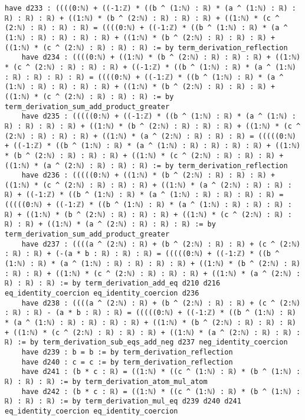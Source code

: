 \documentclass{article}
\begin{document}
\begin{tcolorbox}[colback=white!10, width=\linewidth]
\begin{lstlisting}[language=Lean4]
    have d233 : ((((0:ℕ) + ((-1:ℤ) * ((b ^ (1:ℕ) : ℝ) * (a ^ (1:ℕ) : ℝ) : ℝ) : ℝ) : ℝ) + ((1:ℕ) * (b ^ (2:ℕ) : ℝ) : ℝ) : ℝ) + ((1:ℕ) * (c ^ (2:ℕ) : ℝ) : ℝ) : ℝ) = ((((0:ℕ) + ((-1:ℤ) * ((b ^ (1:ℕ) : ℝ) * (a ^ (1:ℕ) : ℝ) : ℝ) : ℝ) : ℝ) + ((1:ℕ) * (b ^ (2:ℕ) : ℝ) : ℝ) : ℝ) + ((1:ℕ) * (c ^ (2:ℕ) : ℝ) : ℝ) : ℝ) := by term_derivation_reflection
    have d234 : ((((0:ℕ) + ((1:ℕ) * (b ^ (2:ℕ) : ℝ) : ℝ) : ℝ) + ((1:ℕ) * (c ^ (2:ℕ) : ℝ) : ℝ) : ℝ) + ((-1:ℤ) * ((b ^ (1:ℕ) : ℝ) * (a ^ (1:ℕ) : ℝ) : ℝ) : ℝ) : ℝ) = ((((0:ℕ) + ((-1:ℤ) * ((b ^ (1:ℕ) : ℝ) * (a ^ (1:ℕ) : ℝ) : ℝ) : ℝ) : ℝ) + ((1:ℕ) * (b ^ (2:ℕ) : ℝ) : ℝ) : ℝ) + ((1:ℕ) * (c ^ (2:ℕ) : ℝ) : ℝ) : ℝ) := by term_derivation_sum_add_product_greater
    have d235 : (((((0:ℕ) + ((-1:ℤ) * ((b ^ (1:ℕ) : ℝ) * (a ^ (1:ℕ) : ℝ) : ℝ) : ℝ) : ℝ) + ((1:ℕ) * (b ^ (2:ℕ) : ℝ) : ℝ) : ℝ) + ((1:ℕ) * (c ^ (2:ℕ) : ℝ) : ℝ) : ℝ) + ((1:ℕ) * (a ^ (2:ℕ) : ℝ) : ℝ) : ℝ) = (((((0:ℕ) + ((-1:ℤ) * ((b ^ (1:ℕ) : ℝ) * (a ^ (1:ℕ) : ℝ) : ℝ) : ℝ) : ℝ) + ((1:ℕ) * (b ^ (2:ℕ) : ℝ) : ℝ) : ℝ) + ((1:ℕ) * (c ^ (2:ℕ) : ℝ) : ℝ) : ℝ) + ((1:ℕ) * (a ^ (2:ℕ) : ℝ) : ℝ) : ℝ) := by term_derivation_reflection
    have d236 : (((((0:ℕ) + ((1:ℕ) * (b ^ (2:ℕ) : ℝ) : ℝ) : ℝ) + ((1:ℕ) * (c ^ (2:ℕ) : ℝ) : ℝ) : ℝ) + ((1:ℕ) * (a ^ (2:ℕ) : ℝ) : ℝ) : ℝ) + ((-1:ℤ) * ((b ^ (1:ℕ) : ℝ) * (a ^ (1:ℕ) : ℝ) : ℝ) : ℝ) : ℝ) = (((((0:ℕ) + ((-1:ℤ) * ((b ^ (1:ℕ) : ℝ) * (a ^ (1:ℕ) : ℝ) : ℝ) : ℝ) : ℝ) + ((1:ℕ) * (b ^ (2:ℕ) : ℝ) : ℝ) : ℝ) + ((1:ℕ) * (c ^ (2:ℕ) : ℝ) : ℝ) : ℝ) + ((1:ℕ) * (a ^ (2:ℕ) : ℝ) : ℝ) : ℝ) := by term_derivation_sum_add_product_greater
    have d237 : ((((a ^ (2:ℕ) : ℝ) + (b ^ (2:ℕ) : ℝ) : ℝ) + (c ^ (2:ℕ) : ℝ) : ℝ) + (-(a * b : ℝ) : ℝ) : ℝ) = (((((0:ℕ) + ((-1:ℤ) * ((b ^ (1:ℕ) : ℝ) * (a ^ (1:ℕ) : ℝ) : ℝ) : ℝ) : ℝ) + ((1:ℕ) * (b ^ (2:ℕ) : ℝ) : ℝ) : ℝ) + ((1:ℕ) * (c ^ (2:ℕ) : ℝ) : ℝ) : ℝ) + ((1:ℕ) * (a ^ (2:ℕ) : ℝ) : ℝ) : ℝ) := by term_derivation_add_eq d210 d216 eq_identity_coercion eq_identity_coercion d236
    have d238 : ((((a ^ (2:ℕ) : ℝ) + (b ^ (2:ℕ) : ℝ) : ℝ) + (c ^ (2:ℕ) : ℝ) : ℝ) - (a * b : ℝ) : ℝ) = (((((0:ℕ) + ((-1:ℤ) * ((b ^ (1:ℕ) : ℝ) * (a ^ (1:ℕ) : ℝ) : ℝ) : ℝ) : ℝ) + ((1:ℕ) * (b ^ (2:ℕ) : ℝ) : ℝ) : ℝ) + ((1:ℕ) * (c ^ (2:ℕ) : ℝ) : ℝ) : ℝ) + ((1:ℕ) * (a ^ (2:ℕ) : ℝ) : ℝ) : ℝ) := by term_derivation_sub_eqs_add_neg d237 neg_identity_coercion
    have d239 : b = b := by term_derivation_reflection
    have d240 : c = c := by term_derivation_reflection
    have d241 : (b * c : ℝ) = ((1:ℕ) * ((c ^ (1:ℕ) : ℝ) * (b ^ (1:ℕ) : ℝ) : ℝ) : ℝ) := by term_derivation_atom_mul_atom
    have d242 : (b * c : ℝ) = ((1:ℕ) * ((c ^ (1:ℕ) : ℝ) * (b ^ (1:ℕ) : ℝ) : ℝ) : ℝ) := by term_derivation_mul_eq d239 d240 d241 eq_identity_coercion eq_identity_coercion

\end{lstlisting}
\end{tcolorbox}
\end{document}
